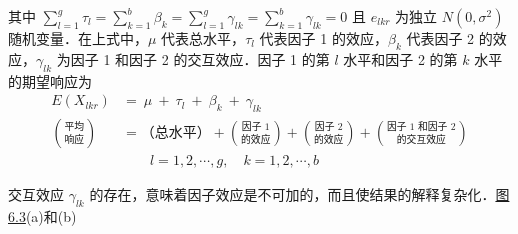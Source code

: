 其中 $\sum\limits_{l=1}^{g}\tau_l=\sum\limits_{k=1}^{b}\beta_k=\sum\limits_{l=1}^{g}\gamma_{lk}=\sum\limits_{k=1}^{b}\gamma_{lk}=0$ 且 $e_{lkr}$ 为独立 $N(0,\sigma^2)$ 随机变量．在上式中，$\mu$ 代表总水平，$\tau_l$ 代表因子 1 的效应，$\beta_k$ 代表因子 2 的效应，$\gamma_{lk}$ 为因子 1 和因子 2 的交互效应．因子 1 的第 $l$ 水平和因子 2 的第 $k$ 水平的期望响应为
\label{eq:6-55}
\begin{equation}
\begin{aligned}
E(X_{lkr})&=\ \mu\ +\ \tau_l\ +\ \beta_k\ +\ \gamma_{lk}\\
\binom{\text{平均}}{\text{响应}}&=\text{（总水平）}+\binom{\text{因子 1}}{\text{的效应}}+\binom{\text{因子 2}}{\text{的效应}}+\binom{\text{因子 1 和因子 2}}{\text{的交互效应}}\\
&\qquad l=1,2,\cdots,g,\quad k=1,2,\cdots,b
\end{aligned}
\tag{6-55}
\end{equation}

交互效应 $\gamma_{lk}$ 的存在，意味着因子效应是不可加的，而且使结果的解释复杂化．\hyperref[fig:6.3]{图 6.3}(a)和(b)
